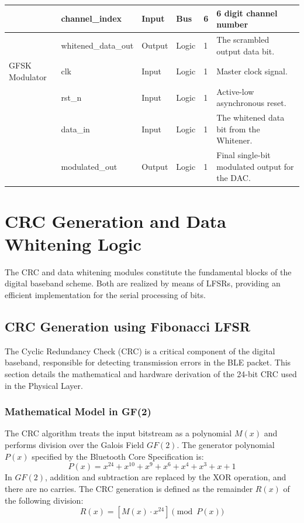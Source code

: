 \documentclass[12pt,singleside,a4paper]{report}
\begin{document}
\begin{longtable}{|p{2.5cm}|p{3cm}|p{1.5cm}|p{1.5cm}|p{1.2cm}|p{4.5cm}|}
~ & channel\_index & Input & Bus & 6 & 6 digit channel number \\ \hline
~ & whitened\_data\_out & Output & Logic & 1 & The scrambled output data bit. \\ \hline
GFSK Modulator & clk & Input & Logic & 1 & Master clock signal. \\ \hline
~ & rst\_n & Input & Logic & 1 & Active-low asynchronous reset. \\ \hline
~ & data\_in & Input & Logic & 1 & The whitened data bit from the Whitener. \\ \hline
~ & modulated\_out & Output & Logic & 1 & Final single-bit modulated output for the DAC. \\

\end{longtable}
\section{CRC Generation and Data Whitening Logic}
The CRC and data whitening modules constitute the fundamental blocks of the digital baseband scheme.
Both are realized by means of LFSRs, providing an efficient implementation for the
serial processing of bits.

\subsection{CRC Generation using Fibonacci LFSR}

The Cyclic Redundancy Check (CRC) is a critical component of the digital baseband, responsible for detecting transmission errors in the BLE packet. This section details the mathematical and hardware derivation of the 24-bit CRC used in the Physical Layer.

\subsubsection{Mathematical Model in GF(2)}
The CRC algorithm treats the input bitstream as a polynomial $M(x)$ and performs division over the Galois Field $GF(2)$. The generator polynomial $P(x)$ specified by the Bluetooth Core Specification is:
\begin{equation}
P(x) = x^{24} + x^{10} + x^9 + x^6 + x^4 + x^3 + x + 1
\end{equation}
In $GF(2)$, addition and subtraction are replaced by the XOR operation, and there are no carries. The CRC generation is defined as the remainder $R(x)$ of the following division:
\begin{equation}
R(x) = [M(x) \cdot x^{24}] \pmod{P(x)}
\end{equation}
\end{document}
